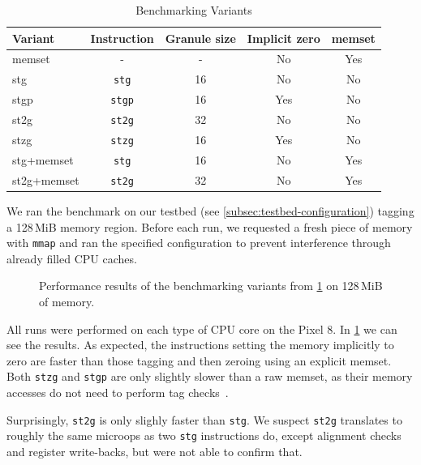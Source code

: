 \begin{table}[h]
    \centering
    \small
    \begin{tabular}{| l || c | c |  c | c |}
        \hline
        \textbf{Variant} & \textbf{Instruction} & \textbf{Granule size} & \textbf{Implicit zero} & \textbf{memset} \\
        \hline
        memset      & -             & -  & No  & Yes \\
        stg         & \texttt{stg}  & 16 & No  & No  \\
        stgp        & \texttt{stgp} & 16 & Yes & No  \\
        st2g        & \texttt{st2g} & 32 & No  & No  \\
        stzg        & \texttt{stzg} & 16 & Yes & No  \\
        stg+memset  & \texttt{stg}  & 16 & No  & Yes \\
        st2g+memset & \texttt{st2g} & 32 & No  & Yes \\
        \hline
    \end{tabular}
    \caption{Benchmarking Variants}
    \label{tab:stg-instructions}
\end{table}

We ran the benchmark on our testbed (see \cref{subsec:testbed-configuration}) tagging a 128\,MiB memory region.
Before each run, we requested a fresh piece of memory with \texttt{mmap} and ran the specified configuration to prevent interference through already filled CPU caches.

\begin{figure}[h]
    \centering
    
    \caption{Performance results of the benchmarking variants from \cref{tab:stg-instructions} on 128\,MiB of memory.}
    \label{fig:stg-performance}
\end{figure}

All runs were performed on each type of CPU core on the Pixel 8.
In \cref{fig:stg-performance} we can see the results.
As expected, the instructions setting the memory implicitly to zero are faster than those tagging and then zeroing using an explicit memset.
Both \texttt{stzg} and \texttt{stgp} are only slightly slower than a raw memset, as their memory accesses do not need to perform tag checks~\cite{ARMA2024Arch64}.

Surprisingly, \texttt{st2g} is only slighly faster than \texttt{stg}.
We suspect \texttt{st2g} translates to roughly the same microops as two \texttt{stg} instructions do, except alignment checks and register write-backs, but were not able to confirm that.


